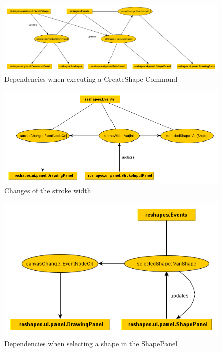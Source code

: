 \begin{figure}[h]
    \begin{center}
        \includegraphics[width=1\textwidth]{img/createshape_events}
    \end{center}
    \caption{Dependencies when executing a CreateShape-Command}
    \label{fig:createshape_events}
\end{figure}

\begin{figure}[h]
    \begin{center}
        \includegraphics[width=1\textwidth]{img/strokeinput_events}
    \end{center}
    \caption{Changes of the stroke width}
    \label{fig:strokeinput_events}
\end{figure}

\begin{figure}[h]
    \begin{center}
        \includegraphics[width=1\textwidth]{img/shapeselect_events}
    \end{center}
    \caption{Dependencies when selecting a shape in the ShapePanel}
    \label{fig:shapeselect_events}
\end{figure}
